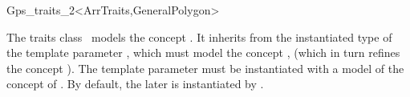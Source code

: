 \ccRefPageBegin

\begin{ccRefClass}{Gps_traits_2<ArrTraits,GeneralPolygon>}

\ccThreeToTwo

\ccDefinition
The traits class \ccRefName\ models the concept 
. It inherits from the instantiated 
type of the template parameter , which must model the 
concept , (which in turn refines
the concept ). The template parameter
 must be instantiated with a model of the concept
of . By default, the later is instantiated by
.

 
\ccIsModel

\end{ccRefClass}
\ccRefPageEnd
